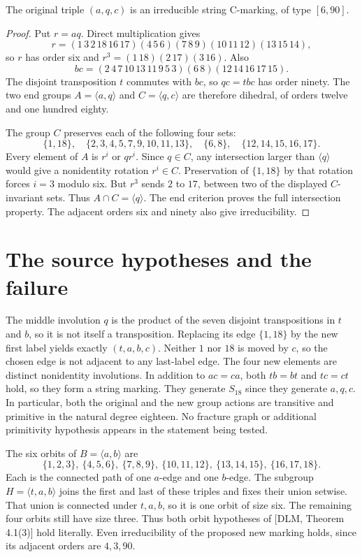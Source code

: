 \documentclass[a4paper,11pt]{article}
\newcommand{\gen}[1]{\langle#1\rangle}
\begin{document}
\begin{lemma}\label{oldc}
The original triple $(a,q,c)$ is an irreducible string C-marking,
of type $[6,90]$.
\end{lemma}
\begin{proof}
Put $r=aq$. Direct multiplication gives
\[
 r=(1\,3\,2\,18\,16\,17)(4\,5\,6)(7\,8\,9)
   (10\,11\,12)(13\,15\,14),
\]
so $r$ has order six and
$r^3=(1\,18)(2\,17)(3\,16)$. Also
\[
 bc=(2\,4\,7\,10\,13\,11\,9\,5\,3)(6\,8)
       (12\,14\,16\,17\,15).
\]
The disjoint transposition $t$ commutes with $bc$, so $qc=tbc$ has order
ninety. The two end groups $A=\gen{a,q}$ and $C=\gen{q,c}$ are therefore
dihedral, of orders twelve and one hundred eighty.

The group $C$ preserves each of the following four sets:
\[
 \{1,18\},\quad \{2,3,4,5,7,9,10,11,13\},\quad
 \{6,8\},\quad \{12,14,15,16,17\}.
\]
Every element of $A$ is $r^i$ or $qr^i$. Since $q\in C$, any intersection
larger than $\gen q$ would give a nonidentity rotation $r^i\in C$.
Preservation of $\{1,18\}$ by that rotation forces $i=3$ modulo six.
But $r^3$ sends $2$ to $17$, between two of the displayed $C$-invariant
sets. Thus $A\cap C=\gen q$. The end criterion proves the full
intersection property. The adjacent orders six and ninety also give
irreducibility.
\end{proof}

\section{The source hypotheses and the failure}
The middle involution $q$ is the product of the seven disjoint
transpositions in $t$ and $b$, so it is not itself a transposition.
Replacing its edge $\{1,18\}$ by the new first label yields exactly
$(t,a,b,c)$. Neither $1$ nor $18$ is moved by $c$, so the chosen edge is
not adjacent to any last-label edge. The four new elements are distinct
nonidentity involutions. In addition to $ac=ca$, both $tb=bt$ and
$tc=ct$ hold, so they form a string marking. They generate $S_{18}$
since they generate $a,q,c$. In particular, both the original and the new
group actions are transitive and primitive in the natural degree eighteen.
No fracture graph or additional primitivity hypothesis appears in the
statement being tested.

The six orbits of $B=\gen{a,b}$ are
\[
 \{1,2,3\},\ \{4,5,6\},\ \{7,8,9\},\
 \{10,11,12\},\ \{13,14,15\},\ \{16,17,18\}.
\]
Each is the connected path of one $a$-edge and one $b$-edge.
The subgroup $H=\gen{t,a,b}$ joins the first and last of these triples
and fixes their union setwise. That union is connected under $t,a,b$,
so it is one orbit of size six. The remaining four orbits still have
size three. Thus both orbit hypotheses of [DLM, Theorem 4.1(3)] hold
literally. Even irreducibility of the proposed new marking holds, since
its adjacent orders are $4,3,90$.
\end{document}
